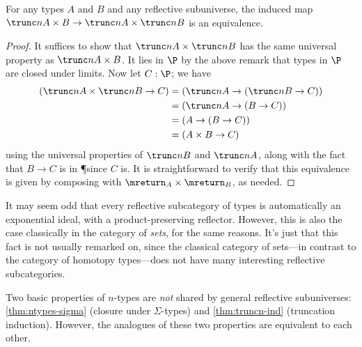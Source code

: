 \begin{cor}\label{cor:trunc_prod}
  For any types $A$ and $B$ and any reflective subuniverse, the induced map $\reflect(A\times B) \to \reflect(A) \times \reflect(B)$ is an equivalence.
\end{cor}
\begin{proof}
  It suffices to show that $\reflect(A) \times \reflect(B)$ has the same universal property as $\reflect(A\times B)$.
  It lies in $\P$ by the above remark that types in $\P$ are closed under limits.
  Now let $C:\P$; we have
  \begin{align*}
    (\reflect(A) \times \reflect(B) \to C)
    &= (\reflect(A) \to (\reflect(B) \to C))\\
    &= (\reflect(A) \to (B \to C))\\
    &= (A \to (B \to C))\\
    &= (A \times B \to C)
  \end{align*}
  using the universal properties  of $\reflect(B)$ and $\reflect(A)$, along with the fact that $B\to C$ is in \P since $C$ is.
  It is straightforward to verify that this equivalence is given by composing with $\mreturn_A \times \mreturn_B$, as needed.
\end{proof}

It may seem odd that every reflective subcategory of types is automatically an exponential ideal, with a product-preserving reflector.
However, this is also the case classically in the category of \emph{sets}, for the same reasons.
It's just that this fact is not usually remarked on, since the classical category of sets---in contrast to the category of homotopy
types---does not have many interesting reflective subcategories.

Two basic properties of $n$-types are \emph{not} shared by general reflective subuniverses: \cref{thm:ntypes-sigma} (closure under $\Sigma$-types) and \cref{thm:truncn-ind} (truncation induction).
However, the analogues of these two properties are equivalent to each other.



